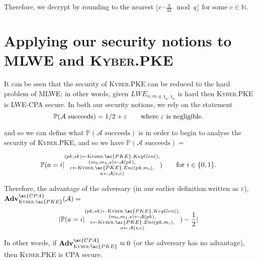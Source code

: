 \documentclass[a4paper, 10pt]{article}
\theoremstyle{definition}
\begin{document}
Therefore, we decrypt by rounding to the nearest $\lfloor c \cdot \frac{q}{32} \mod{q}\rfloor $ for some $c \in \mathbb{N}$.



\section{Applying our security notions to \ac{MLWE} and \textsc{Kyber}.\ac{PKE}}

It can be seen that the security of \textsc{Kyber}.\ac{PKE} can be reduced to the hard problem of \ac{MLWE}; in other words, given $LWE_{n,m,q,\chi _\mathbf{s}, \chi _\mathbf{e}}$ is hard then \textsc{Kyber}.\ac{PKE} is \ac{LWE}-\ac{CPA} secure. In both our security notions, we rely on the statement
\[\mathbb{P} (\mathcal{A} \mbox{ succeeds}) = 1/2 + \varepsilon \mbox{\qquad where $\varepsilon$ is negligible.}\]

and so we can define what $\mathbb{P} (\mathcal{A} \mbox{ succeeds})$ is in order to begin to analyse the security of \textsc{Kyber}.\ac{PKE}, and so we have $\mathbb{P} (\mathcal{A} \mbox{ succeeds})=$

\[\mathbb{P} (a =  i |\substack{ (pk, sk) \leftarrow \textsc{Kyber}.\ac{PKE}.KeyGen(),\\ (m_0, m_1, s) \leftarrow \mathcal{A}(pk),\\ c \leftarrow \textsc{Kyber}.\ac{PKE}.Enc(pk, m_i),\\ a \leftarrow \mathcal{A}(s, c)}) \qquad \mbox{for $i \in \{0,1\}$.}\]


Therefore, the advantage of the adversary (in our earlier definition written as $\varepsilon$),\\ $\mathbf{Adv}^{\ac{CPA}}_{\textsc{Kyber}.\ac{PKE}}(\mathcal{A}) =$
\[ |\mathbb{P} (a =  i |\substack{(pk, sk) \leftarrow \textsc{Kyber}.\ac{PKE}.KeyGen(),\\ (m_0, m_1, s) \leftarrow \mathcal{A}(pk),\\ c \leftarrow \textsc{Kyber}.\ac{PKE}.Enc(pk, m_i),\\ a \leftarrow \mathcal{A}(s, c)}) - \frac{1}{2}| \]

In other words, if $\mathbf{Adv}^{\ac{CPA}}_{\textsc{Kyber}.\ac{PKE}} \approx 0$ (or the adversary has no advantage), then \textsc{Kyber}.\ac{PKE} is \ac{CPA} secure.\par
\end{document}
